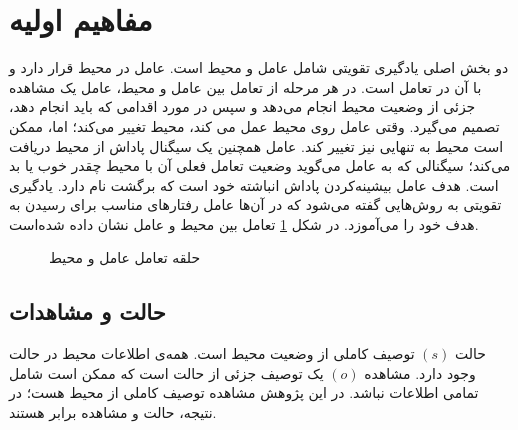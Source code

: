 \section{مفاهیم اولیه}\label{sec:RL_concept}
دو بخش اصلی یادگیری تقویتی
شامل عامل
 و محیط
  است. عامل در محیط قرار دارد و با آن در تعامل است.
  در هر مرحله از تعامل بین عامل و محیط، عامل یک مشاهده جزئی از وضعیت محیط انجام می‌دهد و سپس در مورد اقدامی که باید انجام دهد، تصمیم می‌گیرد. وقتی عامل روی محیط عمل می کند، محیط تغییر می‌کند؛ اما، ممکن است محیط به تنهایی نیز تغییر کند.
  عامل همچنین یک سیگنال پاداش
   از محیط دریافت می‌کند؛ سیگنالی که به عامل می‌گوید وضعیت تعامل فعلی آن با محیط چقدر خوب یا بد است. هدف عامل بیشینه‌کردن پاداش انباشته خود است که برگشت
    نام دارد. یادگیری تقویتی به روش‌هایی گفته می‌شود که در آن‌ها عامل رفتارهای مناسب برای رسیدن به هدف خود را می‌آموزد. در شکل
    \ref{fig:agent_env}
    تعامل بین محیط و عامل نشان داده شده‌است.
\begin{figure}[H]
	\begin{center}
	\end{center}
	\caption{حلقه تعامل عامل و محیط}
	\label{fig:agent_env}
\end{figure}
\subsection{حالت و مشاهدات}
حالت
\((s)\)
 توصیف کاملی از وضعیت محیط است. همه‌ی اطلاعات محیط در حالت وجود دارد. مشاهده
 \((o)\)
  یک توصیف جزئی از حالت است که ممکن است شامل تمامی اطلاعات نباشد. در این پژوهش مشاهده توصیف کاملی از محیط هست؛ در نتیجه، حالت و مشاهده برابر هستند.
